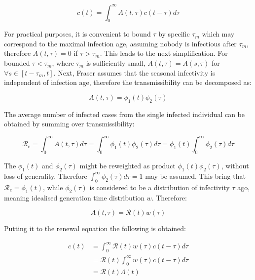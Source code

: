 \documentclass[
  digital, %
  oneside, %
  lof,     %
  lot,     %
]{fithesis4}
\begin{document}
\begin{equation}
c( t ) = \int^{\infty}_0 A ( t, \tau ) c ( t - \tau ) d\tau
\end{equation}

For practical purposes, it is convenient to bound $\tau$ 
by specific $\tau_m$ which may correspond to the maximal 
infection age, assuming nobody is infectious after 
$\tau_m$, therefore $A(t, \tau) = 0$ if $\tau > \tau_m$.
This leads to the next simplification.
For bounded $\tau < \tau_m$, where $\tau_m$ is 
sufficiently small, $A(t, \tau) = A(s, \tau)$ for 
$\forall s \in \left[ t - \tau_m, t \right]$.
Next, Fraser assumes that the seasonal infectivity is 
independent of infection age, therefore the transmissibility 
can be decomposed as:

\begin{equation}
A(t, \tau) = \phi_1(t) \phi_2(\tau)
\end{equation}

The average number of infected cases from the single infected 
individual can be obtained by summing over transmissibility:

\begin{equation}
\mathcal{R}_e = \int^{\infty}_0 A(t, \tau) d\tau = \int^{\infty}_0 \phi_1(t) \phi_2(\tau) d\tau = \phi_1(t) \int^{\infty}_0 \phi_2(\tau) d\tau
\end{equation}

The $\phi_1(t)$ and $\phi_2(\tau)$ might be reweighted as 
product $\phi_1(t) \phi_2(\tau)$, without loss of generality. 
Therefore $\int^{\infty}_0 \phi_2(\tau) d\tau = 1$ may be assumed. 
This bring that $\mathcal{R}_e = \phi_1(t)$, while $\phi_2(\tau)$ 
is considered to be a distribution of infectivity $\tau$ ago, 
meaning idealised generation time distribution $w$. 
Therefore:

\begin{equation}
A(t, \tau) = \mathcal{R}(t) w(\tau)
\end{equation}

Putting it to the renewal equation the following is obtained:

\begin{equation}
  \begin{split}
    c(t) & = \int^{\infty}_0 \mathcal{R}(t) w(\tau) c(t - \tau) d\tau \\
    & = \mathcal{R}(t) \int^{\infty}_0 w(\tau) c(t - \tau) d\tau\\
    & = \mathcal{R}(t) \Lambda(t)    
  \end{split}
\end{equation}
\end{document}
